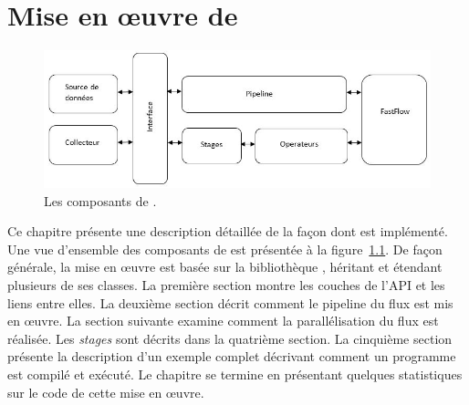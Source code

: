 
\chapter{Mise en \oe{}uvre de \PpFf}
\label{implementation.chap}






\begin{figure}
\centering
     \includegraphics[width=1.0\textwidth]{Figures/AllComponentsAPI.jpg}
      \caption{Les composants de .}
       \label{AllComponentsAPI.fig}
\end{figure}


Ce chapitre pr\'esente une description d\'etaill\'ee de la fa\c{c}on dont  est impl\'ement\'e. Une vue d'ensemble des composants de  est pr\'esent\'ee \`a la figure~\ref{AllComponentsAPI.fig}. De fa\c{c}on g\'en\'erale, la mise en \oe{}uvre est bas\'ee sur la biblioth\`eque , h\'eritant et \'etendant plusieurs de ses classes. La premi\`ere section montre les couches de l'API et les liens entre elles.  La deuxi\`eme section d\'ecrit comment le pipeline du flux est mis en œuvre. La section suivante examine comment la parall\'elisation du flux est r\'ealis\'ee. Les \emph{stages} sont d\'ecrits dans la quatri\`eme section. La cinqui\`eme section pr\'esente la description d'un exemple complet d\'ecrivant comment un programme \PpFf{} est compil\'e et ex\'ecut\'e. Le chapitre se termine en pr\'esentant quelques statistiques sur le code de cette mise en \oe{}uvre.


